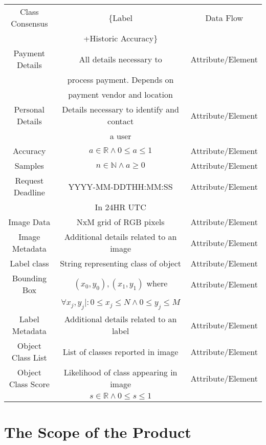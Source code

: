 \documentclass[12pt]{article}
\begin{document}
\begin{center}
  \begin{tabular}{ |c|c|c| } %
    \hline
    Class Consensus &  \{Label & Data Flow \\ 
    &  +Historic Accuracy\} & \\
    \hline
    Payment Details & All details necessary to   & Attribute/Element \\ 
    & process payment. Depends on &\\
    & payment vendor and location  &  \\ 
    \hline
    Personal Details & Details necessary to identify and contact & Attribute/Element \\
    &    a user  &  \\
    \hline
    Accuracy & $a \in \mathbb{R} \wedge 0 \leq a \leq 1$ & Attribute/Element \\
    \hline
    Samples & $n \in \mathbb{N} \wedge a \geq 0 $ & Attribute/Element \\
    \hline
    Request Deadline & YYYY-MM-DDTHH:MM:SS & Attribute/Element \\
    & In 24HR UTC &  \\
    \hline
    Image Data & NxM grid of RGB pixels & Attribute/Element \\
    \hline
    Image Metadata & Additional details related to an image& Attribute/Element \\
    \hline
    Label class & String representing class of object& Attribute/Element \\
    \hline
    Bounding Box & $(x_0,y_0),(x_1,y_1)$ where  & Attribute/Element \\
    & $\forall x_j,y_j |: 0 \leq x_j \leq N \wedge 0 \leq y_j \leq M $   &  \\
    \hline
    Label Metadata & Additional details related to an label& Attribute/Element \\
    \hline
    Object Class List & List of classes reported in image & Attribute/Element \\
    \hline
    Object Class Score & Likelihood of class appearing in image & Attribute/Element \\
    & $s \in \mathbb{R} \wedge 0 \leq s \leq 1$ &  \\
    \hline

  \end{tabular}
\end{center}

\section{The Scope of the Product}
\end{document}
